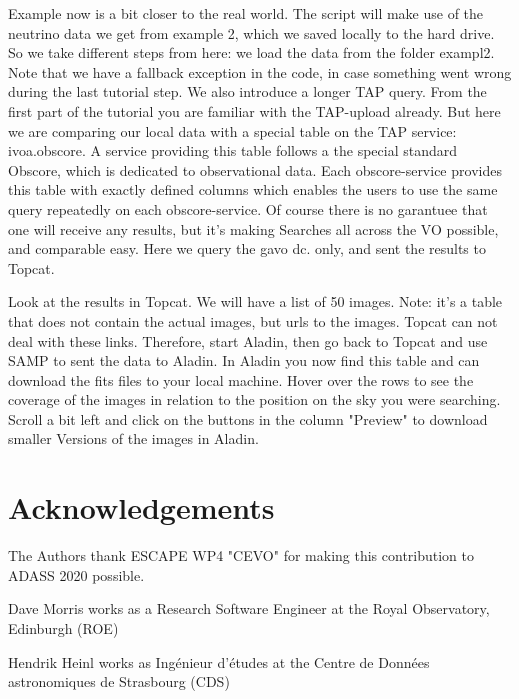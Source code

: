 \documentclass[twoside]{article}[12pt]
\begin{document}
\SAMP


Example now is a bit closer to the real world. The script will make use
of the neutrino data we get from example 2, which we saved locally to
the hard drive. So we take different steps from here: we load the data
from the folder exampl2. Note that we have a fallback exception in the
code, in case something went wrong during the last tutorial step. We
also introduce a longer TAP query. From the first part of the tutorial
you are familiar with the TAP-upload already. But here we are comparing
our local data with a special table on the TAP service: ivoa.obscore. 
A service providing this table follows a the special standard Obscore,
which is dedicated to observational data. Each obscore-service provides
this table with exactly defined columns which enables the users to use
the same query repeatedly on each obscore-service. Of course there is no
garantuee that one will receive any results, but it's making Searches
all across the VO possible, and comparable easy. Here we query the gavo
dc. only, and sent the results to Topcat. 

\OBSCORE


Look at the results in Topcat. We will have a list of 50 images. Note:
it's a table that does not contain the actual images, but urls to the
images. Topcat can not deal with these links. Therefore, start Aladin,
then go back to Topcat and use SAMP to sent the data to Aladin. 
In Aladin you now find this table and can download the fits files to
your local machine. Hover over the rows to see the coverage of the
images in relation to the position on the sky you were searching. 
Scroll a bit left and click on the buttons in the column "Preview" to
download smaller Versions of the images in Aladin. 





\section {Acknowledgements}
The Authors thank ESCAPE WP4 "CEVO" for making this contribution to
ADASS 2020 possible.

Dave Morris works as a Research Software Engineer at the Royal Observatory,
Edinburgh (ROE)

Hendrik Heinl works as Ingénieur d'études at the Centre de Données
astronomiques de Strasbourg (CDS)
\end{document}
